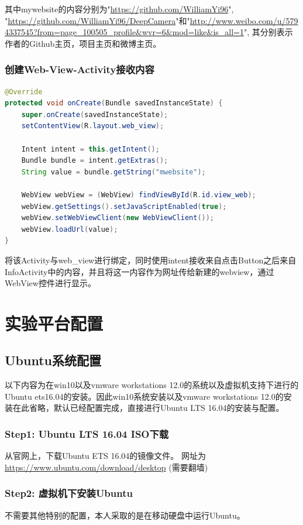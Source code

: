 \documentclass[UTF8, Microsoft YaHei]{book}
\begin{document}
	其中mywebsite的内容分别为"\url{https://github.com/WilliamYi96}", "\url{https://github.com/WilliamYi96/DeepCamera}"和"\url{http://www.weibo.com/u/5794337545?from=page_100505_profile&wvr=6&mod=like&is_all=1}", 其分别表示作者的Github主页，项目主页和微博主页。

	\subsection{创建Web-View-Activity接收内容}
\begin{small}
\begin{lstlisting}[language=java]
@Override
protected void onCreate(Bundle savedInstanceState) {
    super.onCreate(savedInstanceState);
    setContentView(R.layout.web_view);

    Intent intent = this.getIntent();
    Bundle bundle = intent.getExtras();
    String value = bundle.getString("mwebsite");

    WebView webView = (WebView) findViewById(R.id.view_web);
    webView.getSettings().setJavaScriptEnabled(true);
    webView.setWebViewClient(new WebViewClient());
    webView.loadUrl(value);
}
\end{lstlisting}
\end{small}

	将该Activity与web\_view进行绑定，同时使用intent接收来自点击Button之后来自Info\*\*Activity中的内容，并且将这一内容作为网址传给新建的webview，通过WebView控件进行显示。

    \chapter{实验平台配置}
    \section{Ubuntu系统配置}
    以下内容为在win10以及vmware workstations 12.0的系统以及虚拟机支持下进行的Ubuntu ets16.04的安装。因此win10系统安装以及vmware workstations 12.0的安装在此省略，默认已经配置完成，直接进行Ubuntu LTS 16.04的安装与配置。

    \subsection{Step1: Ubuntu LTS 16.04 ISO下载}
    从官网上，下载Ubuntu ETS 16.04的镜像文件。 网址为   \url{https://www.ubuntu.com/download/desktop} (需要翻墙)

    \subsection{Step2: 虚拟机下安装Ubuntu}
    不需要其他特别的配置，本人采取的是在移动硬盘中运行Ubuntu。
\end{document}
